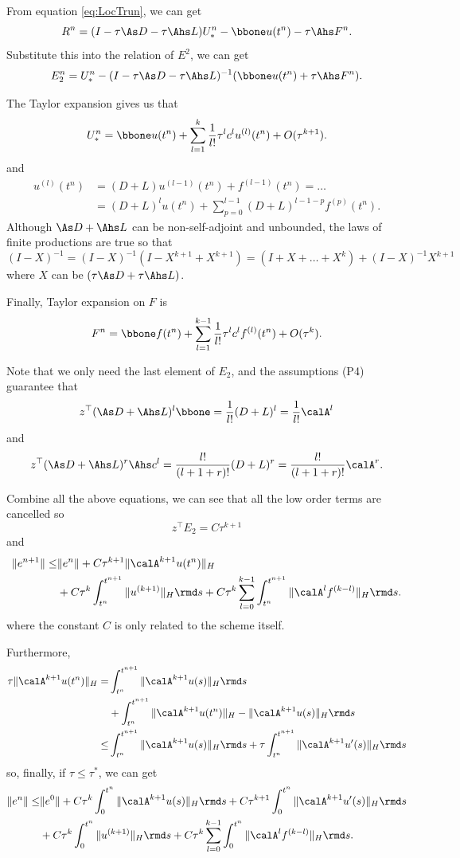 From equation \eqref{eq:LocTrun}, we can get
$$R^n = (I - \tau \As D - \tau \Ahs L) U_*^n - \bbone u(t^n) - \tau \Ahs F^n.$$
Substitute this into the relation of $E^2$, we can get
$$E_2^n = U_*^n - (I - \tau \As D - \tau \Ahs L)^{-1} (\bbone u(t^n) + \tau \Ahs F^n).$$

The Taylor expansion gives us that
$$U_*^n = \bbone u(t^n) + \sum_{l=1}^{k} \frac{1}{l!}\tau^l c^l u^{(l)}(t^n) + O(\tau^{k+1}).$$
and 
\begin{align*}u^{(l)}(t^n) &= (D+L)u^{(l-1)}(t^n) + f^{(l-1)}(t^n) = \dots \\
    &= (D+L)^lu(t^n) + \sum_{p=0}^{l-1} (D+L)^{l-1-p}f^{(p)}(t^n). 
\end{align*}
Although $\As D + \Ahs L$ can be non-self-adjoint and unbounded, 
the laws of finite productions are true so that 
$$(I-X)^{-1} = (I-X)^{-1}(I-X^{k+1} +X^{k+1}) = (I+X+\dots +X^k) + (I-X)^{-1}X^{k+1}$$
where $X$ can be $(\tau \As D+\tau\Ahs L)$. 

Finally, Taylor expansion on $F$ is 
$$F^n = \bbone f(t^n) + \sum_{l=1}^{k-1} \frac{1}{l!}\tau^lc^lf^{(l)}(t^n) + O(\tau^k).$$

Note that we only need the last element of $E_2$, and the assumptions (P4) guarantee that
$$z^\top (\As D+\Ahs L)^l \bbone = \frac{1}{l!}(D+L)^l = \frac{1}{l!}\calA^l$$
and
$$z^\top (\As D+\Ahs L)^r\Ahs c^l = \frac{l!}{(l+1+r)!}(D+L)^r= \frac{l!}{(l+1+r)!}\calA^r.$$

Combine all the above equations, we can see that 
all the low order terms are cancelled so 
$$z^\top E_2 = C \tau^{k+1} $$
and
\begin{align*}\|e^{n+1}\| \leq& \|e^n\| + 
C\tau^{k+1} \|\calA^{k+1}u(t^n)\|_H  \\
&+C\tau^k \int_{t^n}^{t^{n+1}}\|u^{(k+1)}\|_H \rmd s 
+ C\tau^k \sum_{l=0}^{k-1} \int_{t^n}^{t^{n+1}}\|\calA^lf^{(k-l)}\|_H\rmd s
.
\end{align*}
where the constant $C$ is only related to the 
scheme itself. 

Furthermore, 
\begin{align*}
\tau\|\calA^{k+1}u(t^n)\|_H =& \int_{t^n}^{t^{n+1}}\|\calA^{k+1}u(s)\|_H\rmd s \\
&+ \int_{t^n}^{t^{n+1}}\|\calA^{k+1}u(t^n)\|_H- \|\calA^{k+1}u(s)\|_H \rmd s \\
\leq&  \int_{t^n}^{t^{n+1}}\|\calA^{k+1}u(s)\|_H\rmd s + \tau \int_{t^n}^{t^{n+1}}\|\calA^{k+1}u'(s)\|_H\rmd s \\
\end{align*}
so, finally, if $\tau \leq \tau^*$, we can get
\begin{align*}\|e^{n}\| \leq& \|e^0\| + 
    C\tau^{k} \int_{0}^{t^{n}}\|\calA^{k+1}u(s)\|_H\rmd s + C\tau^{k+1} \int_{0}^{t^{n}}\|\calA^{k+1}u'(s)\|_H\rmd s  \\
    &+C\tau^k \int_{0}^{t^{n}}\|u^{(k+1)}\|_H \rmd s 
    + C\tau^k \sum_{l=0}^{k-1} \int_{0}^{t^{n}}\|\calA^lf^{(k-l)}\|_H\rmd s
    .
    \end{align*}

